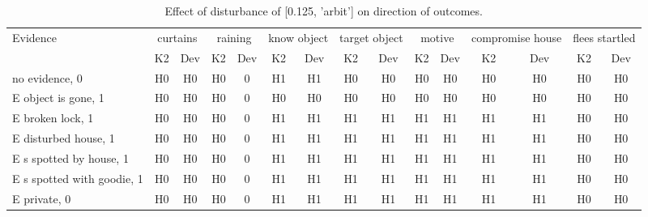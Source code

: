 \begin{table}\begin{tabular}{l|cc|cc|cc|cc|cc|cc|cc}\toprule\multirow{2}{*}{Evidence} & \multicolumn{2}{c}{curtains}& \multicolumn{2}{c}{raining}& \multicolumn{2}{c}{know object}& \multicolumn{2}{c}{target object}& \multicolumn{2}{c}{motive}& \multicolumn{2}{c}{compromise house}& \multicolumn{2}{c}{flees startled}\\& {K2} & {Dev}& {K2} & {Dev}& {K2} & {Dev}& {K2} & {Dev}& {K2} & {Dev}& {K2} & {Dev}& {K2} & {Dev}\\\midrule
no evidence, 0 & H0&H0&\cellcolor{Bittersweet}H0&\cellcolor{Bittersweet}0&H1&H1&H0&H0&H0&H0&H0&H0&H0&H0\\E object is gone, 1 & H0&H0&\cellcolor{Bittersweet}H0&\cellcolor{Bittersweet}0&H0&H0&H0&H0&H0&H0&H0&H0&H0&H0\\E broken lock, 1 & H0&H0&\cellcolor{Bittersweet}H0&\cellcolor{Bittersweet}0&H1&H1&H1&H1&H1&H1&H1&H1&H0&H0\\E disturbed house, 1 & H0&H0&\cellcolor{Bittersweet}H0&\cellcolor{Bittersweet}0&H1&H1&H1&H1&H1&H1&H1&H1&H0&H0\\E s spotted by house, 1 & H0&H0&\cellcolor{Bittersweet}H0&\cellcolor{Bittersweet}0&H1&H1&H1&H1&H1&H1&H1&H1&H0&H0\\E s spotted with goodie, 1 & H0&H0&\cellcolor{Bittersweet}H0&\cellcolor{Bittersweet}0&H1&H1&H1&H1&H1&H1&H1&H1&H0&H0\\E private, 0 & H0&H0&\cellcolor{Bittersweet}H0&\cellcolor{Bittersweet}0&H1&H1&H1&H1&H1&H1&H1&H1&H0&H0\\\bottomrule\end{tabular}\caption{Effect of disturbance of [0.125, 'arbit'] on direction of outcomes.}\end{table}